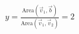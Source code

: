 \documentclass[preview]{standalone}
\begin{document}
\begin{align*}
y = \frac{\text{Area}(\vec{v}_1, \vec{b})}{\text{Area}(\vec{v}_1, \vec{v}_2)} = 2
\end{align*}
\end{document}
